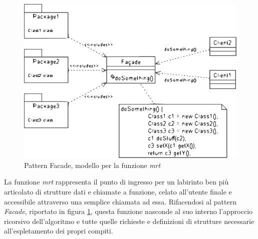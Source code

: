 \begin{figure}[t]
 \centering
 \includegraphics[scale=0.80]{immagini/facade.pdf}
 \caption{Pattern Facade, modello per la funzione \textit{mrt}}
 \label{fig:facade}
\end{figure}

La funzione \textit{mrt} rappresenta il punto di ingresso per un labirinto ben più articolato di strutture dati e chiamate a funzione, celato all'utente finale e accessibile attraverso una semplice chiamata ad essa. Rifacendosi al pattern \textit{Facade}, riportato in figura \ref{fig:facade}, questa funzione nasconde al suo interno l'approccio ricorsivo dell'algoritmo e tutte quelle richieste e definizioni di strutture necessarie all'espletamento dei propri compiti.


